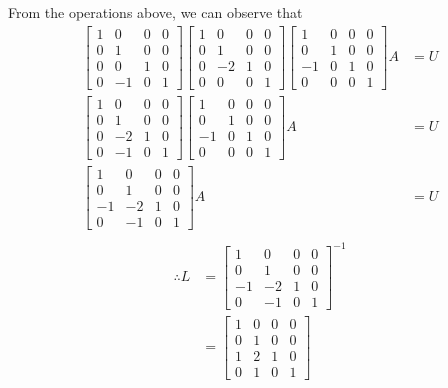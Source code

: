 \documentclass{article}
\begin{document}
\begin{enumerate}
From the operations above, we can observe that \begin{align*}
\begin{bmatrix}
1&0&0&0\\0&1&0&0\\0&0&1&0\\0&-1&0&1
\end{bmatrix}\begin{bmatrix}
1&0&0&0\\0&1&0&0\\0&-2&1&0\\0&0&0&1
\end{bmatrix}\begin{bmatrix}
1&0&0&0\\0&1&0&0\\-1&0&1&0\\0&0&0&1
\end{bmatrix}A &= U\\
 \begin{bmatrix}
1&0&0&0\\0&1&0&0\\0&-2&1&0\\0&-1&0&1
\end{bmatrix}\begin{bmatrix}
1&0&0&0\\0&1&0&0\\-1&0&1&0\\0&0&0&1
\end{bmatrix}A &= U\\
 \begin{bmatrix}
1&0&0&0\\0&1&0&0\\-1&-2&1&0\\0&-1&0&1
\end{bmatrix}A &= U\\
\end{align*}\begin{align*}
\therefore L&=  \begin{bmatrix}
1&0&0&0\\0&1&0&0\\-1&-2&1&0\\0&-1&0&1
\end{bmatrix}^{-1}\\&= \begin{bmatrix}
1&0&0&0\\0&1&0&0\\1&2&1&0\\0&1&0&1
\end{bmatrix}
\end{align*}


\end{enumerate}
\end{document}

